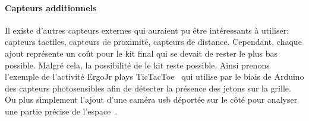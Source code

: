            \paragraph{Capteurs additionnels}
                Il existe d'autres capteurs externes qui auraient pu être intéressants à utiliser: capteurs tactiles, capteurs de proximité, capteurs de distance. Cependant, chaque ajout représente un coût pour le kit final qui se devait de rester le plus bas possible. Malgré cela, la possibilité de  le kit reste possible. Ainsi prenons l'exemple de l'activité ErgoJr plays TicTacToe~ qui utilise par le biais de Arduino des capteurs photosensibles afin de détecter la présence des jetons sur la grille. Ou plus simplement l'ajout d'une caméra usb déportée sur le côté pour analyser une partie précise de l'espace~.%
